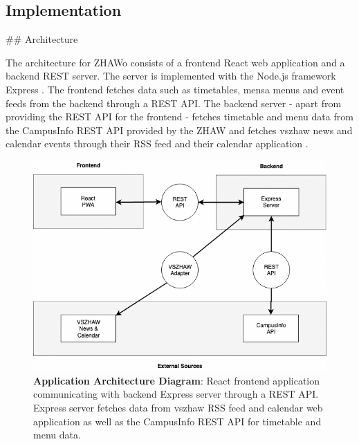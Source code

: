 \begin{markdown}
\section{Implementation} \label{implementation}

## Architecture

The architecture for ZHAWo consists of a frontend React web application \cite{React} and a backend REST server. The server is implemented with the Node.js \cite{Node} framework Express \cite{Express}. The frontend fetches data such as timetables, mensa menus and event feeds from the backend through a REST API. The backend server - apart from providing the REST API for the frontend - fetches timetable and menu data from the CampusInfo REST API provided by the ZHAW and fetches vszhaw news and calendar events through their RSS feed \cite{VszhawNews} and their calendar application \cite{VszhawCalendar}.

\bigskip
\bigskip

\begin{figure}[H]
  \includegraphics[width=14cm, center]{../../diagrams/applicationArchitecture.png}
  \captionsetup{width=13.5cm}
  \caption[Application Architecture Diagram]{\textbf{Application Architecture Diagram}: React frontend application communicating with backend Express server through a REST API. Express server fetches data from vszhaw RSS feed and calendar web application as well as the CampusInfo REST API for timetable and menu data.}
\end{figure}

\newpage


\end{markdown}
